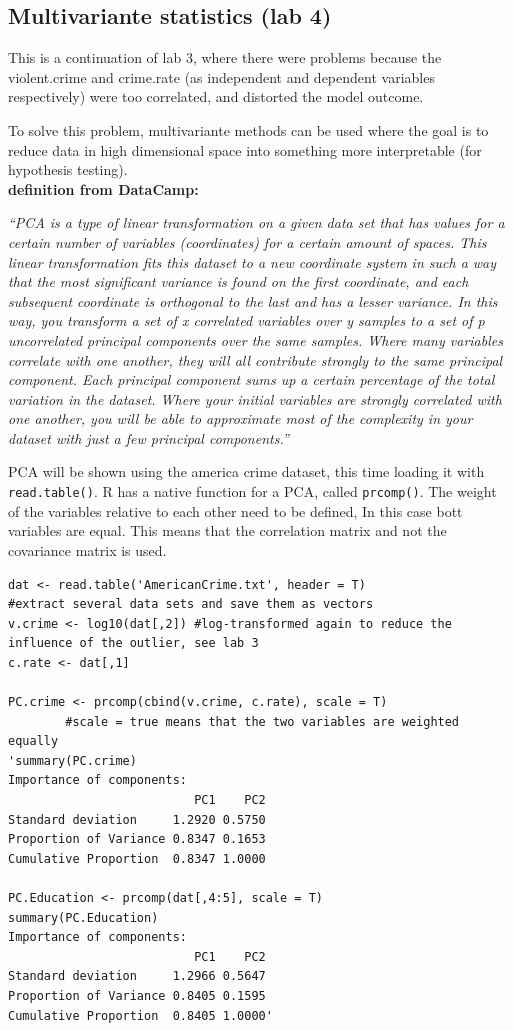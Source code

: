 \documentclass{article}
\begin{document}
\subsection{Multivariante statistics (lab 4)}
This is a continuation of lab 3, where there were problems because the violent.crime and crime.rate (as independent and dependent variables respectively) were too correlated, and distorted the model outcome. \par 
To solve this problem, multivariante methods can be used where the goal is to reduce data in high dimensional space into something more interpretable (for hypothesis testing).  \\
\textbf{definition from DataCamp:}\\
\begin{small}
\begin{center}
\textit{“PCA is a type of linear transformation on a given data set that has values
for a certain number of variables (coordinates) for a certain amount of
spaces. This linear transformation fits this dataset to a new coordinate
system in such a way that the most significant variance is found on the first
coordinate, and each subsequent coordinate is orthogonal to the last and
has a lesser variance. In this way, you transform a set of x correlated
variables over y samples to a set of p uncorrelated principal components
over the same samples. Where many variables correlate with one another,
they will all contribute strongly to the same principal component.
Each principal component sums up a certain percentage of the total
variation in the dataset. Where your initial variables are strongly
correlated with one another, you will be able to approximate most of the
complexity in your dataset with just a few principal components.”}
\end{center}
\end{small} 
PCA will be shown using the america crime dataset, this time loading it with \texttt{read.table()}. R has a native function for a PCA, called  \texttt{prcomp()}. The weight of the variables relative to each other need to be defined, In this case bott variables are equal. This means that the correlation matrix and not the covariance matrix is used.

\begin{lstlisting}
dat <- read.table('AmericanCrime.txt', header = T)
#extract several data sets and save them as vectors
v.crime <- log10(dat[,2]) #log-transformed again to reduce the influence of the outlier, see lab 3
c.rate <- dat[,1]

PC.crime <- prcomp(cbind(v.crime, c.rate), scale = T)
        #scale = true means that the two variables are weighted equally
'summary(PC.crime) 
Importance of components:
                          PC1    PC2
Standard deviation     1.2920 0.5750
Proportion of Variance 0.8347 0.1653
Cumulative Proportion  0.8347 1.0000

PC.Education <- prcomp(dat[,4:5], scale = T)
summary(PC.Education)
Importance of components:
                          PC1    PC2
Standard deviation     1.2966 0.5647
Proportion of Variance 0.8405 0.1595
Cumulative Proportion  0.8405 1.0000'
\end{lstlisting}
\end{document}
